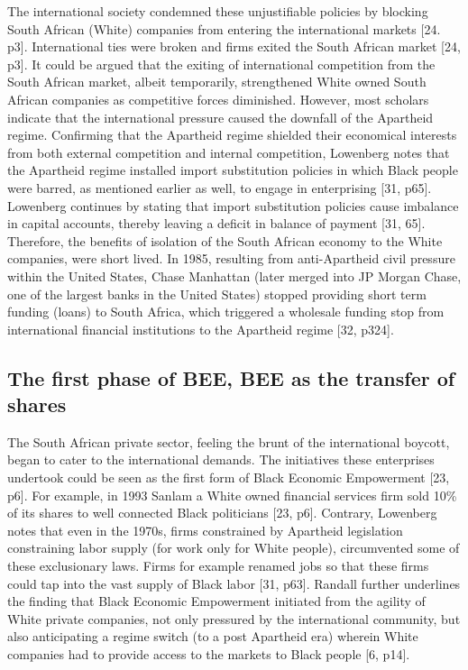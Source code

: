 The international society condemned these unjustifiable policies by blocking South African (White) companies from entering the international markets [24. p3]. International ties were broken and firms exited the South African market [24, p3]. It could be argued that the exiting of international competition from the South African market, albeit temporarily, strengthened White owned South African companies as competitive forces diminished. However, most scholars indicate that the international pressure caused the downfall of the Apartheid regime. Confirming that the Apartheid regime shielded their economical interests from both external competition and internal competition, Lowenberg notes that the Apartheid regime installed import substitution policies in which Black people were barred, as mentioned earlier as well, to engage in enterprising [31, p65]. Lowenberg continues by stating that import substitution policies cause imbalance in capital accounts, thereby leaving a deficit in balance of payment [31, 65]. Therefore, the benefits of isolation of the South African economy to the White companies, were short lived. In 1985, resulting from anti-Apartheid civil pressure within the United States, Chase Manhattan (later merged into JP Morgan Chase, one of the largest banks in the United States) stopped providing short term funding (loans) to South Africa, which triggered a wholesale funding stop from international financial institutions to the Apartheid regime [32, p324].
\subsection{The first phase of BEE, BEE as the transfer of shares}
The South African private sector, feeling the brunt of the international boycott, began to cater to the international demands. The initiatives these enterprises undertook could be seen as the first form of Black Economic Empowerment [23, p6]. For example, in 1993 Sanlam a White owned financial services firm sold 10\%  of its shares to well connected Black politicians [23, p6]. Contrary, Lowenberg notes that even in the 1970s, firms constrained by Apartheid legislation constraining labor supply (for work only for White people), circumvented some of these exclusionary laws. Firms for example renamed jobs so that these firms could tap into the vast supply of Black labor [31, p63]. Randall further underlines the finding that Black Economic Empowerment initiated from the agility of White private companies, not only pressured by the international community, but also anticipating a regime switch (to a post Apartheid era) wherein White companies had to provide access to the markets to Black people [6, p14].

